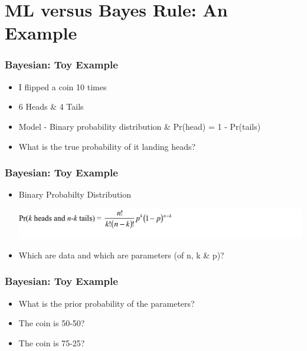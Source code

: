 \documentclass[14pt,handout]{beamer}
\begin{document}
\section{ML versus Bayes Rule: An Example}

\begin{frame}
\frametitle{Bayesian: Toy Example}
\begin{itemize}
	\item<+-> I flipped a coin 10 times
	\item<+-> 6 Heads \& 4 Tails
	\item<+-> Model - Binary probability distribution \& Pr(head) = 1 - Pr(tails)
	\item<+-> What is the true probability of it landing heads?
\end{itemize}
\end{frame}

\begin{frame}
\frametitle{Bayesian: Toy Example}
\begin{itemize}
	\item<+-> Binary Probabilty Distribution
	\begin{center}
	\includegraphics[width=1.5\textwidth]{images_20171130_binProb.png}
	\end{center}
	\item<+-> Which are data and which are parameters (of n, k \& p)?
\end{itemize}
\end{frame}

\begin{frame}
\frametitle{Bayesian: Toy Example}
\begin{itemize}
	\item<+-> What is the prior probability of the parameters?
	\item<+-> The coin is 50-50?
	\item<+-> The coin is 75-25?
\end{itemize}
\end{frame}

\end{document}
